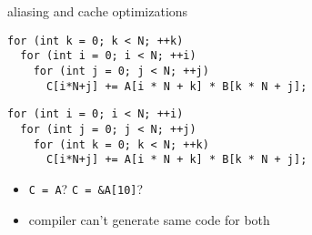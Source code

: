 \begin{frame}[fragile,label=loopOrder]{aliasing and cache optimizations}
    \lstset{language=C,style=small}
\begin{lstlisting}
for (int k = 0; k < N; ++k)
  for (int i = 0; i < N; ++i)
    for (int j = 0; j < N; ++j)
      C[i*N+j] += A[i * N + k] * B[k * N + j];
\end{lstlisting}
\hrulefill
\begin{lstlisting}
for (int i = 0; i < N; ++i)
  for (int j = 0; j < N; ++j)
    for (int k = 0; k < N; ++k)
      C[i*N+j] += A[i * N + k] * B[k * N + j];
\end{lstlisting}
    \begin{itemize}
        \item \lstinline|C = A|? \lstinline|C = &A[10]|?
        \item compiler can't generate same code for both
    \end{itemize}
\end{frame}
